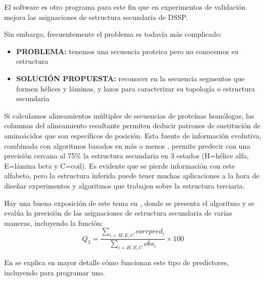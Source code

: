 El software  \citep{Frishman1995} es otro programa para este fin 
que en experimentos de validaci\'{o}n mejora las asignaciones de estructura secundaria de DSSP.

Sin embargo, frecuentemente el problema es todav\'{i}a m\'{a}s complicado:
\begin{itemize}
\item \textbf{PROBLEMA:} tenemos una secuencia proteica pero no conocemos su estructura 
\item \textbf{SOLUCI\'{O}N PROPUESTA:} reconocer en la secuencia segmentos que formen h\'{e}lices y l\'{a}minas, y lazos 
para caracterizar su topolog\'{i}a o estructura secundaria 
\end{itemize} 

Si calculamos alineamientos m\'{u}ltiples de secuencias de prote\'{i}nas hom\'{o}logas,
las columnas del alineamiento resultante permiten deducir patrones de sustituci\'{o}n de amino\'{a}cidos
que son espec\'{i}ficos de posici\'{o}n. Esta fuente de informaci\'{o}n evolutiva,
combinada con algoritmos basados en 
m\'{a}s o menos ,
permite predecir con una precisi\'{o}n cercana al 75\% la estructura secundaria en 3 estados (H=h\'{e}lice alfa, E=l\'{a}mina beta y C=coil).
Es evidente que se pierde informaci\'{o}n con este alfabeto, pero la estructura inferida puede tener muchas aplicaciones a la hora de dise\~nar 
experimentos y algoritmos que trabajen sobre la estructura terciaria. 

Hay una buena exposici\'{o}n de este tema en \cite{Jones1999}, 
donde se presenta el algoritmo 
y se eval\'{u}a la precisi\'{o}n de las asignaciones de estructura secundaria de varias maneras, incluyendo la funci\'{o}n:
\begin{equation}
Q_{3} = \frac{\sum\limits_{i=H,E,C}{corrpred_{i}}}{\sum\limits_{i=H,E,C}{obs_{i}}} \times 100
\end{equation}

En \citet{Jurtz2017} se explica en mayor detalle c\'{o}mo funcionan este tipo de predictores, 
incluyendo 
para programar uno.


